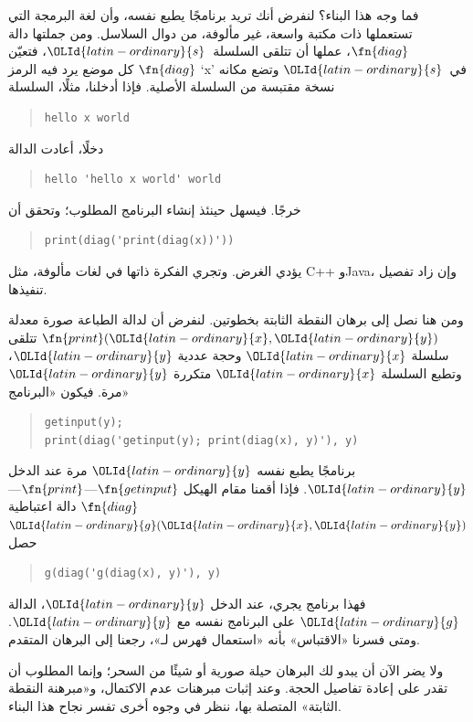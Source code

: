 \documentclass[../../../include/open-logic-section]{subfiles}
\begin{document}
\begin{explain}
فما وجه هذا البناء؟ لنفرض أنك تريد برنامجًا يطبع نفسه،
وأن لغة البرمجة التي تستعملها ذات مكتبة واسعة، غير مألوفة، من دوال
السلاسل. ومن جملتها دالة $\fn{diag}$، عملها
أن تتلقى السلسلة~${\OLId{latin-ordinary}{s}}$، فتعيّن $\fn{diag}$ كل موضع يرد فيه
الرمز `x' في~${\OLId{latin-ordinary}{s}}$ وتضع مكانه نسخة مقتبسة من السلسلة الأصلية. فإذا
أدخلنا، مثلًا، السلسلة
\begin{quote}
\begin{verbatim}
hello x world
\end{verbatim}
\end{quote}
دخلًا، أعادت الدالة
\begin{quote}
\begin{verbatim}
hello 'hello x world' world
\end{verbatim}
\end{quote}
خرجًا. فيسهل حينئذ إنشاء البرنامج المطلوب؛ وتحقق أن
\begin{quote}
\begin{verbatim}
print(diag('print(diag(x))'))
\end{verbatim}
\end{quote}
يؤدي الغرض. وتجري الفكرة ذاتها في لغات مألوفة، مثل C++ وJava،
وإن زاد تفصيل تنفيذها.

ومن هنا نصل إلى برهان النقطة الثابتة بخطوتين. لنفرض أن
لدالة الطباعة صورة معدلة $\fn{print}({\OLId{latin-ordinary}{x}},{\OLId{latin-ordinary}{y}})$ تتلقى سلسلة ${\OLId{latin-ordinary}{x}}$ وحجة
عددية ${\OLId{latin-ordinary}{y}}$، وتطبع السلسلة ${\OLId{latin-ordinary}{x}}$ متكررة ${\OLId{latin-ordinary}{y}}$ مرة.
فيكون «البرنامج»
\begin{quote}
\begin{verbatim}
getinput(y);
print(diag('getinput(y); print(diag(x), y)'), y)
\end{verbatim}
\end{quote}
برنامجًا يطبع نفسه ${\OLId{latin-ordinary}{y}}$ مرة عند الدخل ${\OLId{latin-ordinary}{y}}$. فإذا أقمنا مقام الهيكل
$\fn{getinput}$---$\fn{print}$---$\fn{diag}$ دالة اعتباطية
${\OLId{latin-ordinary}{g}}({\OLId{latin-ordinary}{x}},{\OLId{latin-ordinary}{y}})$ حصل
\begin{quote}
\begin{verbatim}
g(diag('g(diag(x), y)'), y)
\end{verbatim}
\end{quote}
فهذا برنامج يجري، عند الدخل ${\OLId{latin-ordinary}{y}}$، الدالة ${\OLId{latin-ordinary}{g}}$ على البرنامج نفسه مع
${\OLId{latin-ordinary}{y}}$. ومتى فسرنا «الاقتباس» بأنه «استعمال فهرس لـ»، رجعنا إلى
البرهان المتقدم.

ولا يضر الآن أن يبدو لك البرهان حيلة صورية أو شيئًا من
السحر؛ وإنما المطلوب أن تقدر على إعادة تفاصيل الحجة. وعند
إثبات مبرهنات عدم الاكتمال، و«مبرهنة النقطة الثابتة» المتصلة بها،
ننظر في وجوه أخرى تفسر نجاح هذا البناء.
\end{explain}
\end{document}
